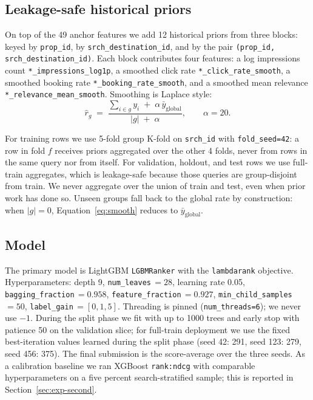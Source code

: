\documentclass[runningheads]{llncs}
\begin{document}
\subsection{Leakage-safe historical priors}
\label{sec:priors}

On top of the 49 anchor features we add 12 historical priors from
three blocks: keyed by \texttt{prop\_id}, by
\texttt{srch\_destination\_id}, and by the pair
\texttt{(prop\_id, srch\_destination\_id)}. Each block contributes
four features: a log impressions count
\texttt{*\_impressions\_log1p}, a smoothed click rate
\texttt{*\_click\_rate\_smooth}, a smoothed booking rate
\texttt{*\_booking\_rate\_smooth}, and a smoothed mean relevance
\texttt{*\_relevance\_mean\_smooth}. Smoothing is Laplace style:
\begin{equation}
\widehat{r}_g \;=\; \frac{\sum_{i \in g} y_i \;+\; \alpha\,\bar{y}_{\text{global}}}
                          {|g| \;+\; \alpha},
\qquad \alpha = 20 .
\label{eq:smooth}
\end{equation}

For training rows we use 5-fold group K-fold on \texttt{srch\_id}
with \texttt{fold\_seed=42}: a row in fold $f$ receives priors
aggregated over the other 4 folds, never from rows in the same
query nor from itself. For validation, holdout, and test rows we
use full-train aggregates, which is leakage-safe because those
queries are group-disjoint from train. We never aggregate over the
union of train and test, even when prior work has done so. Unseen
groups fall back to the global rate by construction: when
$|g| = 0$, Equation~\ref{eq:smooth} reduces to $\bar{y}_{\text{global}}$.

\subsection{Model}
\label{sec:model}

The primary model is LightGBM \texttt{LGBMRanker} with the
\texttt{lambdarank} objective. Hyperparameters: depth 9,
\texttt{num\_leaves}\,$=28$, learning rate 0.05,
\texttt{bagging\_fraction}\,$=0.958$,
\texttt{feature\_fraction}\,$=0.927$,
\texttt{min\_child\_samples}\,$=50$,
\texttt{label\_gain}\,$=[0, 1, 5]$. Threading is pinned
(\texttt{num\_threads=6}); we never use $-1$. During the split
phase we fit with up to 1000 trees and early stop with patience 50
on the validation slice; for full-train deployment we use the
fixed best-iteration values learned during the split phase
(seed 42: 291, seed 123: 279, seed 456: 375). The final submission
is the score-average over the three seeds. As a calibration
baseline we ran XGBoost \texttt{rank:ndcg} with comparable
hyperparameters on a five percent search-stratified sample; this
is reported in Section~\ref{sec:exp-second}.
\end{document}
